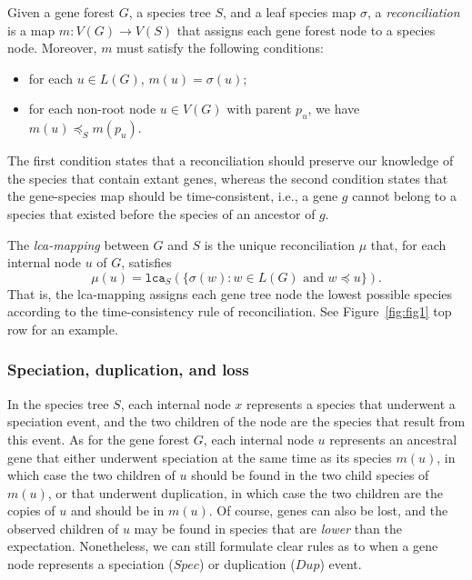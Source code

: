 \documentclass[10pt]{article}
\newcommand{\lca}{\texttt{lca}}
\begin{document}
Given a gene forest $G$, a species tree $S$, and a leaf species map $\sigma$, a \emph{reconciliation} is a map $m : V(G) \rightarrow V(S)$ that assigns each gene forest node to a species node.
Moreover, $m$ must satisfy the following conditions:
\begin{itemize}
    \item for each $u \in L(G)$, $m(u)=\sigma(u)$;
    \item 
    for each non-root node $u \in V(G)$ with parent $p_u$, we have $m(u) \preceq_S m(p_u)$.
\end{itemize}
The first condition states that a reconciliation should preserve our knowledge of the species that contain extant genes, whereas the second condition states that the gene-species map should be time-consistent, i.e., a gene $g$ cannot belong to a species that existed before the species of an ancestor of $g$.

The \emph{lca-mapping} between $G$ and $S$ is the unique reconciliation $\mu$ that, for each internal node $u$ of $G$, satisfies
\[
\mu(u) = \lca_S( \{ \sigma(w) : w \in L(G) \mbox{ and } w \preceq u \} ).
\]
That is, the lca-mapping assigns each gene tree node the lowest possible species according to the time-consistency rule of reconciliation.  See Figure~\ref{fig:fig1} top row for an example.


\subsubsection*{Speciation, duplication, and loss}

In the species tree $S$, each internal node $x$ represents a species that underwent a speciation event, and the two children of the node are the species that result from this event.  
As for the gene forest $G$, each internal node $u$ represents an ancestral gene that either underwent speciation at the same time as its species $m(u)$, in which case the two children of $u$ should be found in the two child species of $m(u)$, or that underwent duplication, in which case the two children are the copies of $u$ and should be in $m(u)$.  Of course, genes can also be lost, and the observed children of $u$ may be found in species that are \emph{lower} than the expectation.  Nonetheless, we can still formulate clear rules as to when a gene node represents a speciation ($Spec$) or duplication ($Dup$) event.
\end{document}
